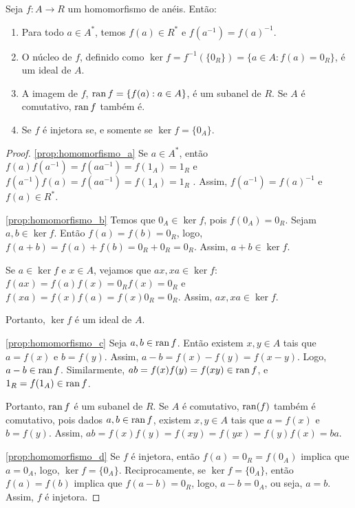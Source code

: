 \begin{prop}
    Seja $f:A\rightarrow R$ um homomorfismo de anéis. Então:
    \begin{enumerate}[label=\alph*)]
        \item Para todo $a \in A^*$, temos $f(a)\in  R^*$ e $f(a^{-1})=f(a)^{-1}$. \label{prop:homomorfismo_a}
        \item O núcleo de $f$, definido como $\ker f=f^{-1}(\{0_R\})=\{a \in A: f(a)=0_R\}$, é um ideal de $A$.\label{prop:homomorfismo_b}
        \item A imagem de $f$, $\operatorname{ran} f=\{f(a): a \in A\}$, é um subanel de $R$. Se $A$ é comutativo, $\operatorname{ran} f$ também é.  \label{prop:homomorfismo_c}
        \item Se $f$ é injetora se, e somente se $\ker f=\{0_A\}$. \label{prop:homomorfismo_d}
    \end{enumerate}
\end{prop}
\begin{proof}
\ref{prop:homomorfismo_a} Se $a \in A^*$, então $f(a)f(a^{-1})=f(aa^{-1})=f(1_A)=1_R$ e $f(a^{-1})f(a)=f(aa^{-1})=f(1_A)=1_R$ . Assim, $f(a^{-1})=f(a)^{-1}$ e $f(a)\in R^*$.

\ref{prop:homomorfismo_b} Temos que $0_A \in \ker f$, pois $f(0_A)=0_R$. Sejam $a, b \in \ker f$. Então $f(a)=f(b)=0_R$, logo, $f(a+b)=f(a)+f(b)=0_R+0_R=0_R$. Assim, $a+b \in \ker f$.

Se $a \in \ker f$ e $x \in A$, vejamos que $ax, xa \in \ker f$: $f(ax)=f(a)f(x)=0_Rf(x)=0_R$ e $f(xa)=f(x)f(a)=f(x)0_R=0_R$. Assim, $ax, xa \in \ker f$.

Portanto, $\ker f$ é um ideal de $A$.

\ref{prop:homomorfismo_c} Seja $a, b \in \operatorname{ran} f$. Então existem $x, y \in A$ tais que $a=f(x)$ e $b=f(y)$. Assim, $a-b=f(x)-f(y)=f(x-y)$. Logo, $a-b \in \operatorname{ran} f$. Similarmente, $ab=f(x)f(y)=f(xy)\in \operatorname{ran} f$, e $1_R=f(1_A)\in \operatorname{ran} f$.

Portanto, $\operatorname{ran} f$ é um subanel de $R$. Se $A$ é comutativo, $\operatorname{ran}(f)$ também é comutativo, pois dados $a, b \in \operatorname{ran} f$, existem $x, y \in A$ tais que $a=f(x)$ e $b=f(y)$. Assim, $ab=f(x)f(y)=f(xy)=f(yx)=f(y)f(x)=ba$.

\ref{prop:homomorfismo_d} Se $f$ é injetora, então $f(a)=0_R=f(0_A)$ implica que $a=0_A$, logo, $\ker f=\{0_A\}$. Reciprocamente, se $\ker f=\{0_A\}$, então $f(a)=f(b)$ implica que $f(a-b)=0_R$, logo, $a-b=0_A$, ou seja, $a=b$. Assim, $f$ é injetora.
\end{proof}

